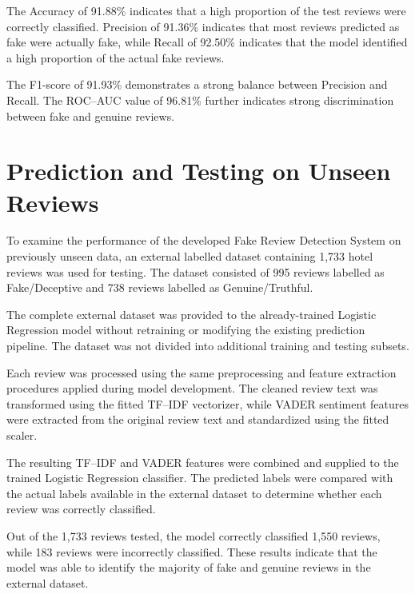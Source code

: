 \documentclass[12pt,a4paper]{report}
\begin{document}
The Accuracy of 91.88\% indicates that a high proportion of the test
reviews were correctly classified. Precision of 91.36\% indicates
that most reviews predicted as fake were actually fake, while Recall
of 92.50\% indicates that the model identified a high proportion of
the actual fake reviews.

The F1-score of 91.93\% demonstrates a strong balance between
Precision and Recall. The ROC--AUC value of 96.81\% further indicates
strong discrimination between fake and genuine reviews.


\section{Prediction and Testing on Unseen Reviews}

To examine the performance of the developed Fake Review
Detection System on previously unseen data, an external
labelled dataset containing 1,733 hotel reviews was
used for testing. The dataset consisted of 995 reviews
labelled as Fake/Deceptive and 738 reviews labelled
as Genuine/Truthful.

The complete external dataset was provided to the
already-trained Logistic Regression model without
retraining or modifying the existing prediction
pipeline. The dataset was not divided into additional
training and testing subsets.

Each review was processed using the same preprocessing
and feature extraction procedures applied during model
development. The cleaned review text was transformed
using the fitted TF--IDF vectorizer, while VADER
sentiment features were extracted from the original
review text and standardized using the fitted scaler.

The resulting TF--IDF and VADER features were combined
and supplied to the trained Logistic Regression
classifier. The predicted labels were compared with
the actual labels available in the external dataset
to determine whether each review was correctly
classified.

Out of the 1,733 reviews tested, the model correctly
classified 1,550 reviews, while 183 reviews were
incorrectly classified. These results indicate that
the model was able to identify the majority of
fake and genuine reviews in the external dataset.
\end{document}
